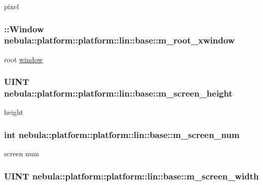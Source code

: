 pixel \hypertarget{classnebula_1_1platform_1_1platform_1_1lin_1_1base_a21289b807f7361be9c7555abd2abd37b}{
\subsubsection[{m\_\-root\_\-xwindow}]{\setlength{\rightskip}{0pt plus 5cm}::Window {\bf nebula::platform::platform::lin::base::m\_\-root\_\-xwindow}}}
\label{classnebula_1_1platform_1_1platform_1_1lin_1_1base_a21289b807f7361be9c7555abd2abd37b}


root \hyperlink{namespacenebula_1_1platform_1_1window}{window} \hypertarget{classnebula_1_1platform_1_1platform_1_1lin_1_1base_a10eb66f7e862a2d101af199609cb9a7c}{
\subsubsection[{m\_\-screen\_\-height}]{\setlength{\rightskip}{0pt plus 5cm}UINT {\bf nebula::platform::platform::lin::base::m\_\-screen\_\-height}}}
\label{classnebula_1_1platform_1_1platform_1_1lin_1_1base_a10eb66f7e862a2d101af199609cb9a7c}


height \hypertarget{classnebula_1_1platform_1_1platform_1_1lin_1_1base_aeebbd6ba56278fcb9ef7f13b301c2b1e}{
\subsubsection[{m\_\-screen\_\-num}]{\setlength{\rightskip}{0pt plus 5cm}int {\bf nebula::platform::platform::lin::base::m\_\-screen\_\-num}}}
\label{classnebula_1_1platform_1_1platform_1_1lin_1_1base_aeebbd6ba56278fcb9ef7f13b301c2b1e}


screen num \hypertarget{classnebula_1_1platform_1_1platform_1_1lin_1_1base_a6a975ac9673882057561a11736555d3f}{
\subsubsection[{m\_\-screen\_\-width}]{\setlength{\rightskip}{0pt plus 5cm}UINT {\bf nebula::platform::platform::lin::base::m\_\-screen\_\-width}}}
\label{classnebula_1_1platform_1_1platform_1_1lin_1_1base_a6a975ac9673882057561a11736555d3f}


